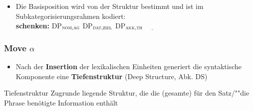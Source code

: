 \begin{frame}

\begin{itemize}
	\item Die Basisposition wird von der Struktur bestimmt und ist im Subkategorisierungsrahmen kodiert:\\
\textbf{schenken:} DP$_{\textsc{nom,ag}}$ DP$_{\textsc{dat,ziel}}$  DP$_{\textsc{akk,th}}$ $\underline{\qquad}$
\end{itemize} 

	\begin{figure}
	\centering
\end{figure}

\end{frame}


\begin{frame}
\frametitle{Move $\alpha$}

\begin{itemize}
	\item Nach der \textbf{Insertion} der lexikalischen Einheiten generiert die syntaktische Komponente eine \textbf{Tiefenstruktur} (Deep Structure, Abk. DS)
\end{itemize}

\begin{block}{Tiefenstruktur}
Zugrunde liegende Struktur, die die (gesamte) für den Satz/""die Phrase benötigte Information enthält
\end{block}

\end{frame}


